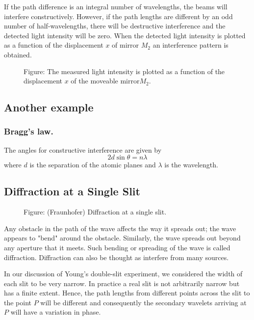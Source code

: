 \documentclass[../../../main.tex]{subfiles}
\begin{document}
If the path difference is an integral number of wavelengths, the beams will interfere constructively. However, if the path lengths are different by an odd number of half-wavelengths, there will be destructive interference and the detected light intensity will be zero. When the detected light intensity is plotted as a function of the displacement $x$ of mirror $M_2$ an interference pattern is obtained.
\begin{figure}
    \centering
    \caption*{Figure: The measured light intensity is plotted as a function of the displacement $x$ of the moveable mirror$M_2$.}
\end{figure}

\subsection{Another example}
\subsubsection{Bragg's law.} The angles for constructive interference are given by
\begin{equation*}
    2d \sin \theta = n\lambda
\end{equation*}
where $d$ is the separation of the atomic planes and $\lambda$ is the wavelength. 

\subsection{Diffraction at a Single Slit}
\begin{figure}
    \centering
    \caption*{Figure: (Fraunhofer) Diffraction at a single slit.}
\end{figure}
Any obstacle in the path of the wave affects the way it spreads out; the wave appears to "bend" around the obstacle. Similarly, the wave spreads out beyond any aperture that it meets. Such bending or spreading of the wave is called diffraction. Diffraction can also be thought as interfere from many sources.

In our discussion of Young's double-slit experiment, we considered the width of each slit to be very narrow. In practice a real slit is not arbitrarily narrow but has a ﬁnite extent. Hence, the path lengths from different points across the slit to the point $P$ will be different and consequently the secondary wavelets arriving at $P$ will have a variation in phase.
\end{document}
